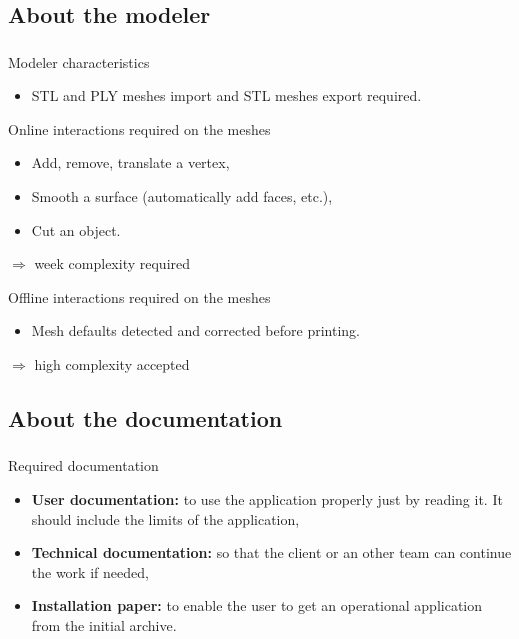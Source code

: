\documentclass{beamer}
\begin{document}
\subsection{About the modeler}
\begin{frame}
	\frametitle{}
	 \begin{block}{Modeler characteristics}
		\begin{itemize}
			\item STL and PLY meshes import and STL meshes export required.
		\end{itemize}
    \end{block}
    
    \begin{block}{Online interactions required on the meshes}
		\begin{itemize}
			\item Add, remove, translate a vertex,
			\item Smooth a surface (automatically add faces, etc.),
			\item Cut an object.
		\end{itemize}
			$\Longrightarrow$ week complexity required
    \end{block}
    
    \begin{block}{Offline interactions required on the meshes}
		\begin{itemize}
			\item Mesh defaults detected and corrected before printing.
		\end{itemize}
			$\Longrightarrow$ high complexity accepted
    \end{block}

\end{frame}

\subsection{About the documentation}
\begin{frame}
	\frametitle{}
	 \begin{block}{Required documentation}
		\begin{itemize}
			\item \textbf{User documentation:} to use the application properly just by reading it. It should include the limits of the application,
			\item \textbf{Technical documentation:} so that the client or an other team can continue the work if needed,
			\item \textbf{Installation paper:} to enable the user to get an operational application from the initial archive.
		\end{itemize}
    \end{block}    

\end{frame}
\end{document}
